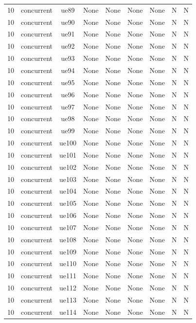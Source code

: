\begin{table}[ht]
\begin{tabular}{|c|c|c|c|c|c|c|c|c|}
10 & concurrent & ue89 & None & None & None & None & N & N \\
10 & concurrent & ue90 & None & None & None & None & N & N \\
10 & concurrent & ue91 & None & None & None & None & N & N \\
10 & concurrent & ue92 & None & None & None & None & N & N \\
10 & concurrent & ue93 & None & None & None & None & N & N \\
10 & concurrent & ue94 & None & None & None & None & N & N \\
10 & concurrent & ue95 & None & None & None & None & N & N \\
10 & concurrent & ue96 & None & None & None & None & N & N \\
10 & concurrent & ue97 & None & None & None & None & N & N \\
10 & concurrent & ue98 & None & None & None & None & N & N \\
10 & concurrent & ue99 & None & None & None & None & N & N \\
10 & concurrent & ue100 & None & None & None & None & N & N \\
10 & concurrent & ue101 & None & None & None & None & N & N \\
10 & concurrent & ue102 & None & None & None & None & N & N \\
10 & concurrent & ue103 & None & None & None & None & N & N \\
10 & concurrent & ue104 & None & None & None & None & N & N \\
10 & concurrent & ue105 & None & None & None & None & N & N \\
10 & concurrent & ue106 & None & None & None & None & N & N \\
10 & concurrent & ue107 & None & None & None & None & N & N \\
10 & concurrent & ue108 & None & None & None & None & N & N \\
10 & concurrent & ue109 & None & None & None & None & N & N \\
10 & concurrent & ue110 & None & None & None & None & N & N \\
10 & concurrent & ue111 & None & None & None & None & N & N \\
10 & concurrent & ue112 & None & None & None & None & N & N \\
10 & concurrent & ue113 & None & None & None & None & N & N \\
10 & concurrent & ue114 & None & None & None & None & N & N \\

\end{tabular}
\end{table}
